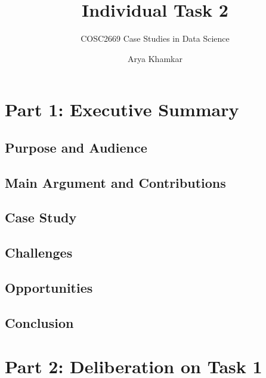 \documentclass[manuscript,nonacm]{acmart} %
\begin{document}
\title{Individual Task 2}
\subtitle{COSC2669 Case Studies in Data Science}

\author{Arya Khamkar}

\maketitle

\section{Part 1: Executive Summary}
\label{sec:part1}

\subsection{Purpose and Audience}

\subsection{Main Argument and Contributions}

\subsection{Case Study}

\subsection{Challenges}

\subsection{Opportunities}

\subsection{Conclusion}

\section{Part 2: Deliberation on Task 1}
\label{sec:part2}
\end{document}
